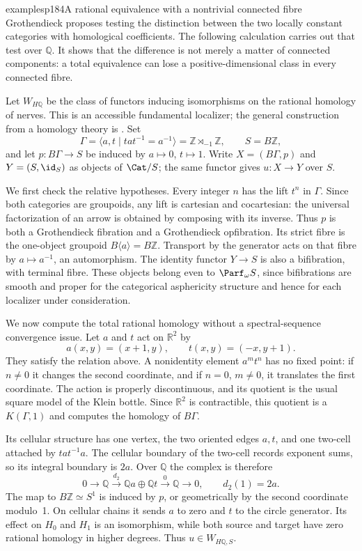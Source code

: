 \begin{dcomment}{examples}{p184}{A rational equivalence with a nontrivial connected fibre}
Grothendieck proposes testing the distinction between the two locally constant categories with homological coefficients. The following calculation carries out that test over $\mathbb Q$. It shows that the difference is not merely a matter of connected components: a total equivalence can lose a positive-dimensional class in every connected fibre.

Let $W_{H\mathbb Q}$ be the class of functors inducing isomorphisms on the rational homology of nerves. This is an accessible fundamental localizer; the general construction from a homology theory is \citet[Theorem~9.4.2 and Corollary~9.4.3]{Cisinski2006}. Set
\[
 \Gamma=\langle a,t\mid tat^{-1}=a^{-1}\rangle
       =\mathbb Z\rtimes_{-1}\mathbb Z,
 \qquad S=B\mathbb Z,
\]
and let $p:B\Gamma\to S$ be induced by $a\mapsto0$, $t\mapsto1$. Write $X=(B\Gamma,p)$ and $Y=(S,\id_S)$ as objects of $\Cat/S$; the same functor gives $u:X\to Y$ over $S$.

We first check the relative hypotheses. Every integer $n$ has the lift $t^n$ in $\Gamma$. Since both categories are groupoids, any lift is cartesian and cocartesian: the universal factorization of an arrow is obtained by composing with its inverse. Thus $p$ is both a Grothendieck fibration and a Grothendieck opfibration. Its strict fibre is the one-object groupoid $B\langle a\rangle=B\mathbb Z$. Transport by the generator acts on that fibre by $a\mapsto a^{-1}$, an automorphism. The identity functor $Y\to S$ is also a bifibration, with terminal fibre. These objects belong even to $\Parf_\omega S$, since bifibrations are smooth and proper for the categorical asphericity structure and hence for each localizer under consideration.

We now compute the total rational homology without a spectral-sequence convergence issue. Let $a$ and $t$ act on $\mathbb R^2$ by
\[
 a(x,y)=(x+1,y),\qquad t(x,y)=(-x,y+1).
\]
They satisfy the relation above. A nonidentity element $a^m t^n$ has no fixed point: if $n\ne0$ it changes the second coordinate, and if $n=0$, $m\ne0$, it translates the first coordinate. The action is properly discontinuous, and its quotient is the usual square model of the Klein bottle. Since $\mathbb R^2$ is contractible, this quotient is a $K(\Gamma,1)$ and computes the homology of $B\Gamma$.

Its cellular structure has one vertex, the two oriented edges $a,t$, and one two-cell attached by $tat^{-1}a$. The cellular boundary of the two-cell records exponent sums, so its integral boundary is $2a$. Over $\mathbb Q$ the complex is therefore
\[
 0\longrightarrow\mathbb Q
 \xrightarrow{\ d_2\ }\mathbb Q a\oplus\mathbb Q t
 \xrightarrow{\ 0\ }\mathbb Q\longrightarrow0,
 \qquad d_2(1)=2a.
\]
The map to $B\mathbb Z\simeq S^1$ is induced by $p$, or geometrically by the second coordinate modulo~1. On cellular chains it sends $a$ to zero and $t$ to the circle generator. Its effect on $H_0$ and $H_1$ is an isomorphism, while both source and target have zero rational homology in higher degrees. Thus $u\in W_{H\mathbb Q,S}$.


\end{dcomment}
